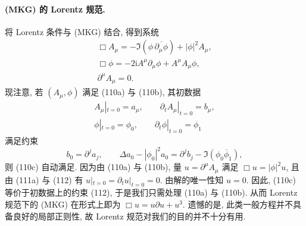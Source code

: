 \paragraph*{(MKG) 的 Lorentz 规范.} 将 Lorentz 条件与 (MKG) 结合, 得到系统
\begin{gather}
\Box A_\mu=-\Im(\phi\,\overline{\partial_\mu\phi})+|\phi|^2A_\mu,\\
\Box\phi=-2\mathrm{i}A^\mu\partial_\mu\phi+A^\mu A_\mu\phi,\\
\partial^\mu A_\mu=0.\end{gather}
现注意, 若 $(A_\mu,\phi)$ 满足 (110a) 与 (110b), 其初数据
\begin{gather}
A_\mu|_{t=0}=a_\mu,\qquad \partial_t A_\mu|_{t=0}=b_\mu,\\
\phi|_{t=0}=\phi_0,\qquad \partial_t\phi|_{t=0}=\phi_1
\end{gather}
满足约束
\begin{equation}
b_0=\partial^j a_j,\qquad \Delta a_0-|\phi_0|^2 a_0=\partial^j b_j-\Im(\phi_0\overline{\phi}_1),\end{equation}
则 (110c) 自动满足. 因为由 (110a) 与 (110b), 量 $u=\partial^\mu A_\mu$ 满足 $\Box u=|\phi|^2u$, 且由 (111a) 与 (112) 有 $u|_{t=0}=\partial_t u|_{t=0}=0$. 由解的唯一性知 $u=0$.
因此, (110c) 等价于初数据上的约束 (112), 于是我们只需处理 (110a) 与 (110b). 从而 Lorentz 规范下的 (MKG) 在形式上即为 $\Box u=u\partial u+u^3$. 遗憾的是, 此类一般方程并不具备良好的局部正则性, 故 Lorentz 规范对我们的目的并不十分有用.
